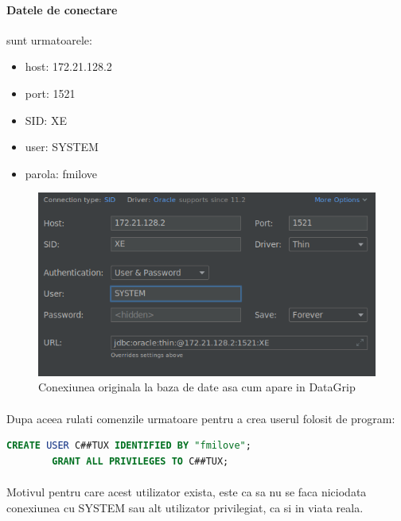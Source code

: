 \documentclass[oneside]{article}
\begin{document}
\paragraph{Datele de conectare} sunt urmatoarele:
\begin{itemize}
    \item host: 172.21.128.2
    \item port: 1521
    \item SID: XE
    \item user: SYSTEM
    \item parola: fmilove
\end{itemize}

\begin{figure}[ht]
    \centering
    \noindent\includegraphics[scale=0.5]{databaseconnection.png}
    \caption{Conexiunea originala la baza de date asa cum apare in DataGrip}
    \label{fig:databaseconnection}
\end{figure}

\paragraph{}Dupa aceea rulati comenzile urmatoare pentru a crea userul folosit de program:

\begin{center}
    \begin{lstlisting}[language=sql]
        CREATE USER C##TUX IDENTIFIED BY "fmilove";
        GRANT ALL PRIVILEGES TO C##TUX;
    \end{lstlisting}
\end{center}

\paragraph{} Motivul pentru care acest utilizator exista, este ca sa nu se faca niciodata conexiunea cu SYSTEM sau alt utilizator privilegiat, ca si in viata reala.
\end{document}
